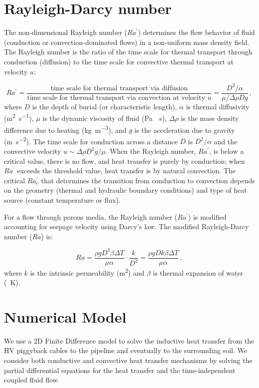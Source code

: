 \documentclass[Journal,letterpaper,InsideFigs]{ascelike-new}
\begin{document}
\section{Rayleigh-Darcy number}
The non-dimensional Rayleigh number ($Ra^\prime$) determines the flow behavior of fluid (conduction or convection-dominated flows) in a non-uniform mass density field. The Rayleigh number is the ratio of the time scale for thermal transport through conduction (diffusion) to the time scale for convective thermal transport at velocity $u$:

\begin{equation}
Ra^\prime = \frac{\text{time scale for thermal transport via diffusion}}{\text{time scale for thermal transport via convection at velocity }u} = \frac{D^2/\alpha}{\mu/\Delta \rho D g} \,,
\label{eq:ra-text}
\end{equation}
\noindent where $D$ is the depth of burial (or characteristic length), $\alpha$ is thermal diffusivity (\si{\meter\squared\per\second}), $\mu$ is the dynamic viscosity of fluid (\si{\pascal\cdot\second}), $\Delta \rho$ is the mass density difference due to heating (\si{\kilogram\per\meter\cubed}), and $g$ is the acceleration due to gravity (\si{\meter\per\second\squared}). The time scale for conduction across a distance $D$ is $D^2/\alpha$ and the convective velocity $u \sim \Delta \rho D^2 g / \mu$. When the Rayleigh number, $Ra^\prime$, is below a critical value, there is no flow, and heat transfer is purely by conduction; when $Ra^\prime$ exceeds the threshold value, heat transfer is by natural convection. The critical $Ra_c^\prime$ that determines the transition from conduction to convection depends on the geometry (thermal and hydraulic boundary conditions) and type of heat source (constant temperature or flux). 

For a flow through porous media, the Rayleigh number ($Ra^\prime$) is modified accounting for seepage velocity using Darcy's law. The modified Rayleigh-Darcy number ($Ra$) is:

\begin{equation}
Ra = \frac{\rho g D^3 \beta \Delta T}{\mu \alpha} \cdot \frac{k}{D^2} = \frac{\rho g D k \beta \Delta T}{\mu \alpha}\,,
\label{eq:ra}
\end{equation}
where $k$ is the intrinsic permeability (\si{\meter\squared}) and $\beta$ is thermal expansion of water (\si{\per\kelvin}). 

\section{Numerical Model}
We use a 2D Finite Difference model to solve the inductive heat transfer from the HV piggyback cables to the pipeline and eventually to the surrounding soil. We consider both conductive and convective heat transfer mechanisms by solving the partial differential equations for the heat transfer and the time-independent coupled fluid flow. 
\end{document}
